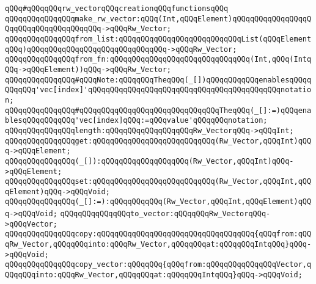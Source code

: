 \newline
\verb|qQQq#qQQqqQQqrw_vectorqQQqcreationqQQqfunctionsqQQq|\newline
\verb|qQQqqQQqqQQqqQQqmake_rw_vector:qQQq(Int,qQQqElement)qQQqqQQqqQQqqQQqqQQqqQQqqQQqqQQqqQQqqQQq->qQQqRw_Vector;|\newline
\verb|qQQqqQQqqQQqqQQqfrom_list:qQQqqQQqqQQqqQQqqQQqqQQqqQQqList(qQQqElementqQQq)qQQqqQQqqQQqqQQqqQQqqQQqqQQqqQQq->qQQqRw_Vector;|\newline
\verb|qQQqqQQqqQQqqQQqfrom_fn:qQQqqQQqqQQqqQQqqQQqqQQqqQQqqQQq(Int,qQQq(IntqQQq->qQQqElement))qQQq->qQQqRw_Vector;|\newline
\newline
\verb|qQQqqQQqqQQqqQQq#qQQqNote:qQQqqQQqTheqQQq(_[])qQQqqQQqqQQqenablesqQQqqQQqqQQq'vec[index]'qQQqqQQqqQQqqQQqqQQqqQQqqQQqqQQqqQQqqQQqqQQqnotation;|\newline
\verb|qQQqqQQqqQQqqQQq#qQQqqQQqqQQqqQQqqQQqqQQqqQQqqQQqTheqQQq(_[]:=)qQQqenablesqQQqqQQqqQQq'vec[index]qQQq:=qQQqvalue'qQQqqQQqnotation;|\newline
\newline
\verb|qQQqqQQqqQQqqQQqlength:qQQqqQQqqQQqqQQqqQQqRw_VectorqQQq->qQQqInt;|\newline
\newline
\verb|qQQqqQQqqQQqqQQqget:qQQqqQQqqQQqqQQqqQQqqQQqqQQq(Rw_Vector,qQQqInt)qQQq->qQQqElement;|\newline
\verb|qQQqqQQqqQQqqQQq(_[]):qQQqqQQqqQQqqQQqqQQq(Rw_Vector,qQQqInt)qQQq->qQQqElement;|\newline
\newline
\verb|qQQqqQQqqQQqqQQqset:qQQqqQQqqQQqqQQqqQQqqQQqqQQq(Rw_Vector,qQQqInt,qQQqElement)qQQq->qQQqVoid;|\newline
\verb|qQQqqQQqqQQqqQQq(_[]:=):qQQqqQQqqQQq(Rw_Vector,qQQqInt,qQQqElement)qQQq->qQQqVoid;|\newline
\newline
\verb|qQQqqQQqqQQqqQQqto_vector:qQQqqQQqRw_VectorqQQq->qQQqVector;|\newline
\newline
\verb|qQQqqQQqqQQqqQQqcopy:qQQqqQQqqQQqqQQqqQQqqQQqqQQqqQQqqQQq{qQQqfrom:qQQqRw_Vector,qQQqqQQqinto:qQQqRw_Vector,qQQqqQQqat:qQQqqQQqIntqQQq}qQQq->qQQqVoid;|\newline
\verb|qQQqqQQqqQQqqQQqcopy_vector:qQQqqQQq{qQQqfrom:qQQqqQQqqQQqqQQqVector,qQQqqQQqinto:qQQqRw_Vector,qQQqqQQqat:qQQqqQQqIntqQQq}qQQq->qQQqVoid;|\newline
\newline
\newline

